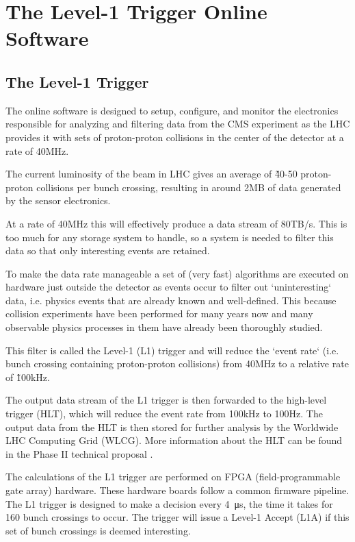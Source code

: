 \chapter{The Level-1 Trigger Online Software}

\section{The Level-1 Trigger}

The online software is designed to setup, configure, and monitor the electronics
responsible for analyzing and filtering data from the CMS experiment
as the LHC provides it with sets of proton-proton collisions in the center of
the detector at a rate of 40MHz.

The current luminosity of the beam in LHC gives an average of \~40-50
proton-proton collisions per bunch crossing, resulting in around 2MB\cite{CMS_Experiment2} of data
generated by the sensor electronics.

At a rate of 40MHz this will effectively produce a data stream of 80TB/s.
This is too much for any storage system to handle, so a system is needed to
filter this data so that only interesting events are retained.

To make the data rate manageable a set of (very fast) algorithms are executed on
hardware just outside the detector as events occur to filter out `uninteresting` data,
i.e. physics events that are already known and well-defined. This because
collision experiments have been performed for many years now and many observable
physics processes in them have already been thoroughly studied.

This filter is called the Level-1 (L1) trigger and will reduce the `event rate`
(i.e. bunch crossing containing proton-proton collisions) from 40MHz to a
relative rate of \~100kHz.

The output data stream of the L1 trigger is then forwarded to the high-level trigger
(HLT), which will reduce the event
rate from 100kHz to 100Hz. The output data from the HLT is then stored for
further analysis by the Worldwide LHC Computing Grid (WLCG).
More information about the HLT can be found in the Phase II technical proposal
\cite{TS_Phase2}.

The calculations of the L1 trigger are performed on FPGA (field-programmable
gate array) hardware.
These hardware boards follow a common firmware pipeline.
The L1 trigger is designed to make a decision every \SI{4}{\micro\second}, the
time it takes for 160 bunch crossings to occur.
The trigger will issue a Level-1 Accept (L1A) if this set of bunch crossings
is deemed interesting.

